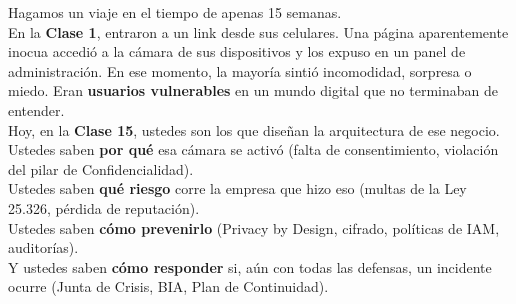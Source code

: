 \documentclass[12pt,a4paper]{article}
\begin{document}
\begin{cajaCierre}[title={El c\'irculo se cierra}]
Hagamos un viaje en el tiempo de apenas 15 semanas.\\[6pt]
En la \textbf{Clase 1}, entraron a un link desde sus celulares. Una p\'agina aparentemente inocua accedi\'o a la c\'amara de sus dispositivos y los expuso en un panel de administraci\'on. En ese momento, la mayor\'ia sinti\'o incomodidad, sorpresa o miedo. Eran \textbf{usuarios vulnerables} en un mundo digital que no terminaban de entender.\\[6pt]
Hoy, en la \textbf{Clase 15}, ustedes son los que dise\~nan la arquitectura de ese negocio.\\[4pt]
\; Ustedes saben \textbf{por qu\'e} esa c\'amara se activ\'o (falta de consentimiento, violaci\'on del pilar de Confidencialidad).\\
\; Ustedes saben \textbf{qu\'e riesgo} corre la empresa que hizo eso (multas de la Ley 25.326, p\'erdida de reputaci\'on).\\
\; Ustedes saben \textbf{c\'omo prevenirlo} (Privacy by Design, cifrado, pol\'iticas de IAM, auditor\'ias).\\
\; Y ustedes saben \textbf{c\'omo responder} si, a\'un con todas las defensas, un incidente ocurre (Junta de Crisis, BIA, Plan de Continuidad).
\end{cajaCierre}

\vspace{6pt}

\begin{center}
\end{center}
\end{document}
